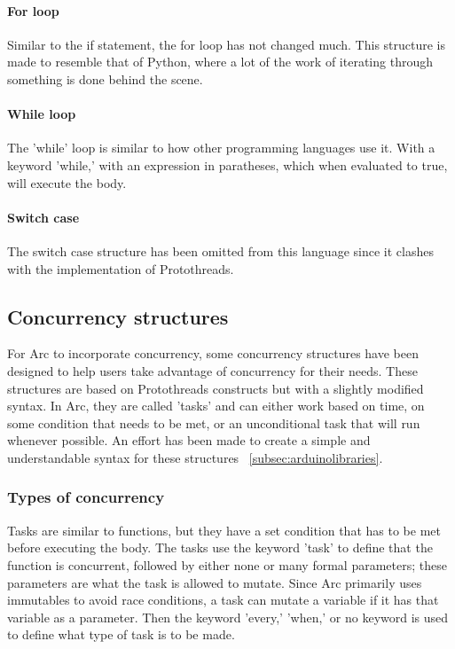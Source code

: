 \paragraph{For loop} Similar to the if statement, the for loop has not changed much. This structure is made to resemble that of Python, where a lot of the work of iterating through something is done behind the scene.

\paragraph{While loop} The 'while' loop is similar to how other programming languages use it. With a keyword 'while,' with an expression in paratheses, which when evaluated to true, will execute the body.

\paragraph{Switch case} The switch case structure has been omitted from this language since it clashes with the implementation of Protothreads.

\subsection{Concurrency structures}\label{sec:concurrency structures}
For Arc to incorporate concurrency, some concurrency structures have been designed to help users take advantage of concurrency for their needs. These structures are based on Protothreads constructs but with a slightly modified syntax. In Arc, they are called 'tasks' and can either work based on time, on some condition that needs to be met, or an unconditional task that will run whenever possible. An effort has been made to create a simple and understandable syntax for these structures ~\ref{subsec:arduinolibraries}.


\subsubsection{Types of concurrency}
Tasks are similar to functions, but they have a set condition that has to be met before executing the body. The tasks use the keyword 'task' to define that the function is concurrent, followed by either none or many formal parameters; these parameters are what the task is allowed to mutate. Since Arc primarily uses immutables to avoid race conditions, a task can mutate a variable if it has that variable as a parameter. Then the keyword 'every,' 'when,' or no keyword is used to define what type of task is to be made.



